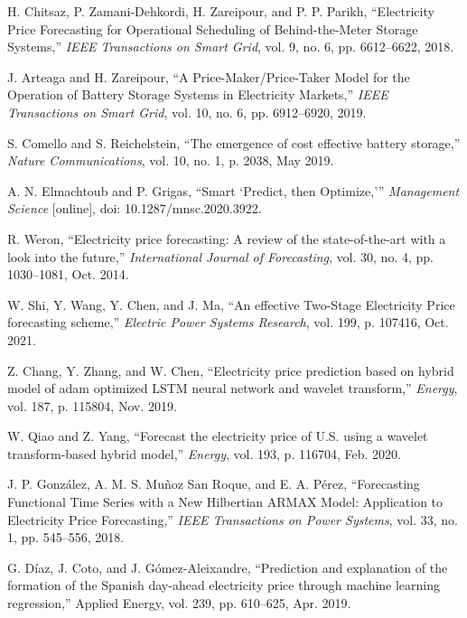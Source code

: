 \documentclass[journal]{IEEEtran}
\begin{document}
\ifCLASSOPTIONcaptionsoff
  \newpage
\fi



\begin{thebibliography}{2}

H. Chitsaz, P. Zamani-Dehkordi, H. Zareipour, and P. P. Parikh, “Electricity Price Forecasting for Operational Scheduling of Behind-the-Meter Storage Systems,” \emph{IEEE Transactions on Smart Grid}, vol. 9, no. 6, pp. 6612–6622, 2018.

J. Arteaga and H. Zareipour, “A Price-Maker/Price-Taker Model for the Operation of Battery Storage Systems in Electricity Markets,” \emph{IEEE Transactions on Smart Grid}, vol. 10, no. 6, pp. 6912–6920, 2019.

S. Comello and S. Reichelstein, “The emergence of cost effective battery storage,” \emph{Nature Communications}, vol. 10, no. 1, p. 2038, May 2019.

A. N. Elmachtoub and P. Grigas, ``Smart `Predict, then Optimize,’” \emph{Management Science} [online], doi: 10.1287/mnsc.2020.3922.

R. Weron, ``Electricity price forecasting: A review of the state-of-the-art with a look into the future,” \emph{International Journal of Forecasting}, vol. 30, no. 4, pp. 1030–1081, Oct. 2014.


W. Shi, Y. Wang, Y. Chen, and J. Ma, “An effective Two-Stage Electricity Price forecasting scheme,” \emph{Electric Power Systems Research}, vol. 199, p. 107416, Oct. 2021.

Z. Chang, Y. Zhang, and W. Chen, “Electricity price prediction based on hybrid model of adam optimized LSTM neural network and wavelet transform,” \emph{Energy}, vol. 187, p. 115804, Nov. 2019.

W. Qiao and Z. Yang, “Forecast the electricity price of U.S. using a wavelet transform-based hybrid model,” \emph{Energy}, vol. 193, p. 116704, Feb. 2020.

J. P. González, A. M. S. Muñoz San Roque, and E. A. Pérez, “Forecasting Functional Time Series with a New Hilbertian ARMAX Model: Application to Electricity Price Forecasting,” \emph{IEEE Transactions on Power Systems}, vol. 33, no. 1, pp. 545–556, 2018.

G. Díaz, J. Coto, and J. Gómez-Aleixandre, “Prediction and explanation of the formation of the Spanish day-ahead electricity price through machine learning regression,” Applied Energy, vol. 239, pp. 610–625, Apr. 2019.


\end{thebibliography}
\end{document}
